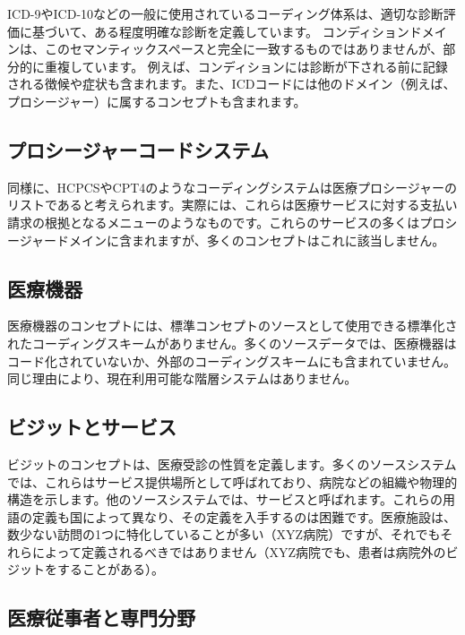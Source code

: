 \documentclass[
  11pt]{book}
\theoremstyle{definition}
\theoremstyle{definition}
\theoremstyle{definition}
\theoremstyle{definition}
\theoremstyle{remark}
\begin{document}
ICD-9やICD-10などの一般に使用されているコーディング体系は、適切な診断評価に基づいて、ある程度明確な診断を定義しています。 コンディションドメインは、このセマンティックスペースと完全に一致するものではありませんが、部分的に重複しています。 例えば、コンディションには診断が下される前に記録される徴候や症状も含まれます。また、ICDコードには他のドメイン（例えば、プロシージャー）に属するコンセプトも含まれます。

\subsection{プロシージャーコードシステム}\label{ux30d7ux30edux30b7ux30fcux30b8ux30e3ux30fcux30b3ux30fcux30c9ux30b7ux30b9ux30c6ux30e0}

同様に、HCPCSやCPT4のようなコーディングシステムは医療プロシージャーのリストであると考えられます。実際には、これらは医療サービスに対する支払い請求の根拠となるメニューのようなものです。これらのサービスの多くはプロシージャードメインに含まれますが、多くのコンセプトはこれに該当しません。

\subsection{医療機器}\label{ux533bux7642ux6a5fux5668}

医療機器のコンセプトには、標準コンセプトのソースとして使用できる標準化されたコーディングスキームがありません。多くのソースデータでは、医療機器はコード化されていないか、外部のコーディングスキームにも含まれていません。同じ理由により、現在利用可能な階層システムはありません。

\subsection{ビジットとサービス}\label{ux30d3ux30b8ux30c3ux30c8ux3068ux30b5ux30fcux30d3ux30b9}

ビジットのコンセプトは、医療受診の性質を定義します。多くのソースシステムでは、これらはサービス提供場所として呼ばれており、病院などの組織や物理的構造を示します。他のソースシステムでは、サービスと呼ばれます。これらの用語の定義も国によって異なり、その定義を入手するのは困難です。医療施設は、数少ない訪問の1つに特化していることが多い（XYZ病院）ですが、それでもそれらによって定義されるべきではありません（XYZ病院でも、患者は病院外のビジットをすることがある）。

\subsection{医療従事者と専門分野}\label{ux533bux7642ux5f93ux4e8bux8005ux3068ux5c02ux9580ux5206ux91ce}
\end{document}
